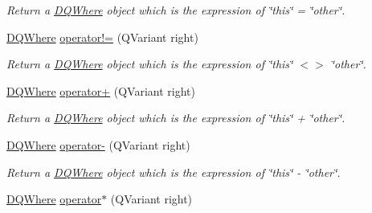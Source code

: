 \begin{DoxyCompactItemize}
\begin{DoxyCompactList}\small\item\em Return a \hyperlink{classDQWhere}{DQWhere} object which is the expression of \char`\"{}this\char`\"{} = \char`\"{}other\char`\"{}. \item\end{DoxyCompactList}\item 
\hypertarget{classDQWhere_aee170d94567aa17e69349eade4b132e9}{
\hyperlink{classDQWhere}{DQWhere} \hyperlink{classDQWhere_aee170d94567aa17e69349eade4b132e9}{operator!=} (QVariant right)}
\label{classDQWhere_aee170d94567aa17e69349eade4b132e9}

\begin{DoxyCompactList}\small\item\em Return a \hyperlink{classDQWhere}{DQWhere} object which is the expression of \char`\"{}this\char`\"{} $<$$>$ \char`\"{}other\char`\"{}. \item\end{DoxyCompactList}\item 
\hypertarget{classDQWhere_a64ee2fda76db115a1bc94b06f0c084d1}{
\hyperlink{classDQWhere}{DQWhere} \hyperlink{classDQWhere_a64ee2fda76db115a1bc94b06f0c084d1}{operator+} (QVariant right)}
\label{classDQWhere_a64ee2fda76db115a1bc94b06f0c084d1}

\begin{DoxyCompactList}\small\item\em Return a \hyperlink{classDQWhere}{DQWhere} object which is the expression of \char`\"{}this\char`\"{} + \char`\"{}other\char`\"{}. \item\end{DoxyCompactList}\item 
\hypertarget{classDQWhere_ae5695197178f8a4afffe8210af37510d}{
\hyperlink{classDQWhere}{DQWhere} \hyperlink{classDQWhere_ae5695197178f8a4afffe8210af37510d}{operator-\/} (QVariant right)}
\label{classDQWhere_ae5695197178f8a4afffe8210af37510d}

\begin{DoxyCompactList}\small\item\em Return a \hyperlink{classDQWhere}{DQWhere} object which is the expression of \char`\"{}this\char`\"{} -\/ \char`\"{}other\char`\"{}. \item\end{DoxyCompactList}\item 
\hypertarget{classDQWhere_aaab6fb374c45bde85d84889684b4919d}{
\hyperlink{classDQWhere}{DQWhere} \hyperlink{classDQWhere_aaab6fb374c45bde85d84889684b4919d}{operator$\ast$} (QVariant right)}
\label{classDQWhere_aaab6fb374c45bde85d84889684b4919d}


\end{DoxyCompactItemize}
